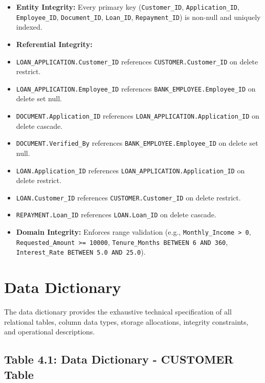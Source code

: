 \documentclass[12pt,a4paper,oneside]{report}
\begin{document}
\begin{itemize}
  \item \textbf{Entity Integrity:} Every primary key (\texttt{Customer\_ID}, \texttt{Application\_ID}, \texttt{Employee\_ID}, \texttt{Document\_ID}, \texttt{Loan\_ID}, \texttt{Repayment\_ID}) is non-null and uniquely indexed.
  \item \textbf{Referential Integrity:}
  \item \texttt{LOAN\_APPLICATION.Customer\_ID} references \texttt{CUSTOMER.Customer\_ID} on delete restrict.
  \item \texttt{LOAN\_APPLICATION.Employee\_ID} references \texttt{BANK\_EMPLOYEE.Employee\_ID} on delete set null.
  \item \texttt{DOCUMENT.Application\_ID} references \texttt{LOAN\_APPLICATION.Application\_ID} on delete cascade.
  \item \texttt{DOCUMENT.Verified\_By} references \texttt{BANK\_EMPLOYEE.Employee\_ID} on delete set null.
  \item \texttt{LOAN.Application\_ID} references \texttt{LOAN\_APPLICATION.Application\_ID} on delete restrict.
  \item \texttt{LOAN.Customer\_ID} references \texttt{CUSTOMER.Customer\_ID} on delete restrict.
  \item \texttt{REPAYMENT.Loan\_ID} references \texttt{LOAN.Loan\_ID} on delete cascade.
  \item \textbf{Domain Integrity:} Enforces range validation (e.g., \texttt{Monthly\_Income > 0}, \texttt{Requested\_Amount >= 10000}, \texttt{Tenure\_Months BETWEEN 6 AND 360}, \texttt{Interest\_Rate BETWEEN 5.0 AND 25.0}).
\end{itemize}

\section{Data Dictionary}

The data dictionary provides the exhaustive technical specification of all relational tables, column data types, storage allocations, integrity constraints, and operational descriptions.

\subsection{Table 4.1: Data Dictionary - CUSTOMER Table}
\end{document}
